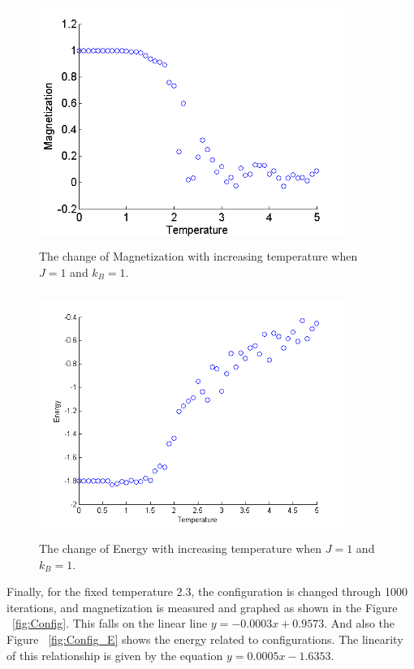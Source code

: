 \documentclass[]{article}
\begin{document}
\begin{figure}[h]
  \centering
  \includegraphics[width=10cm,height=8cm]{figures/Mag_Temp}
  \caption{\label{fig:Mag} The change of Magnetization with increasing temperature when $J=1$ and $k_B=1$.}
\end{figure}

\begin{figure}[t]
  \centering
  \includegraphics[width=10cm,height=8cm]{figures/Ene_temp_scatter}
  \caption{\label{fig:Energy} The change of Energy with increasing temperature when $J=1$ and $k_B=1$.}
\end{figure}

Finally, for the fixed temperature 2.3, the configuration is changed through 1000 iterations, and magnetization is measured and graphed as shown in the Figure ~\ref{fig:Config}. This falls on the linear line $y = -0.0003x + 0.9573$. And also the Figure  ~\ref{fig:Config_E} shows the energy related to configurations. The linearity of this relationship is given by the equation $y = 0.0005x - 1.6353$.
\end{document}
